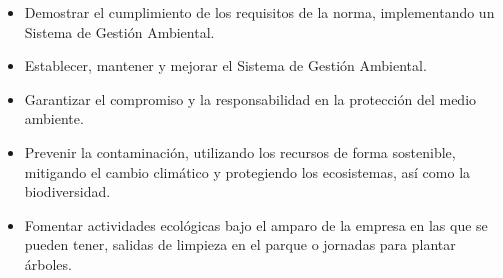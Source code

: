 \begin{itemize}
    \item Demostrar el cumplimiento de los requisitos de la norma, implementando un Sistema de Gestión Ambiental.
    
    \item Establecer, mantener y mejorar el Sistema de Gestión Ambiental.
    
    \item Garantizar el compromiso y la responsabilidad en la protección del medio ambiente.
    
    \item Prevenir la contaminación, utilizando los recursos de forma sostenible, mitigando el cambio climático y protegiendo los ecosistemas, así como la biodiversidad.
    
    \item Fomentar actividades ecológicas bajo el amparo de la empresa en las que se pueden tener, salidas de limpieza en el parque o jornadas para plantar árboles.
    
\end{itemize}
